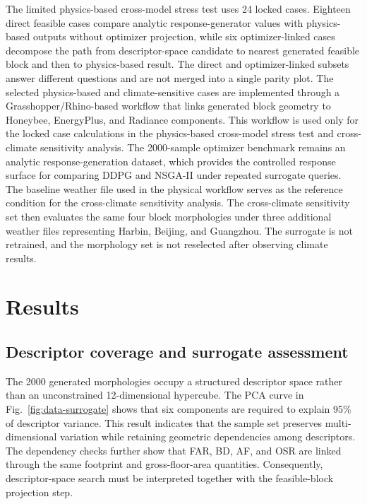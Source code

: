 \documentclass[final,3p,times,numbers,sort&compress]{elsarticle}
\def\textcolor#1#2{#2}%
\def\rev#1{#1}%
\newif\ifshowrevision
\newcommand{\rev}[1]{%
  \ifshowrevision{\textcolor{revisionblue}{#1}}\else#1\fi%
}
\begin{document}
The limited physics-based cross-model stress test uses 24 locked cases. Eighteen direct feasible cases compare analytic response-generator values with physics-based outputs without optimizer projection, while six optimizer-linked cases decompose the path from descriptor-space candidate to nearest generated feasible block and then to physics-based result. The direct and optimizer-linked subsets answer different questions and are not merged into a single parity plot. \rev{The selected physics-based and climate-sensitive cases are implemented through a Grasshopper/Rhino-based workflow that links generated block geometry to Honeybee, EnergyPlus, and Radiance components. This workflow is used only for the locked case calculations in the physics-based cross-model stress test and cross-climate sensitivity analysis. The 2000-sample optimizer benchmark remains an analytic response-generation dataset, which provides the controlled response surface for comparing DDPG and NSGA-II under repeated surrogate queries.} The baseline weather file used in the physical workflow serves as the reference condition for the cross-climate sensitivity analysis. The cross-climate sensitivity set then evaluates the same four block morphologies under three additional weather files representing Harbin, Beijing, and Guangzhou. The surrogate is not retrained, and the morphology set is not reselected after observing climate results.

\section{Results}
\label{sec:results}

\subsection{Descriptor coverage and surrogate assessment}

The 2000 generated morphologies occupy a structured descriptor space rather than an unconstrained 12-dimensional hypercube. The PCA curve in Fig.~\ref{fig:data-surrogate} shows that six components are required to explain 95\% of descriptor variance. This result indicates that the sample set preserves multi-dimensional variation while retaining geometric dependencies among descriptors. The dependency checks further show that FAR, BD, AF, and OSR are linked through the same footprint and gross-floor-area quantities. Consequently, descriptor-space search must be interpreted together with the feasible-block projection step.
\end{document}
